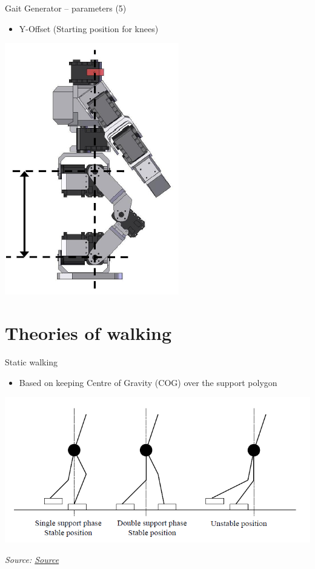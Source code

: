 \documentclass[compress]{beamer}
\newcommand{\source}[2]{{\tiny\it Source: \href{#1}{#2}}}
\begin{document}
\begin{frame}{Gait Generator -- parameters (5)}

    \begin{itemize}

        \item Y-Offset (Starting position for knees)
    \end{itemize}
    \begin{center}
        \includegraphics[height=0.5\paperheight]{bioloid-gait-5}
    \end{center}

\end{frame}

\section{Theories of walking}

\begin{frame}{Static walking}

    \begin{itemize}

        \item Based on keeping Centre of Gravity (COG) over the support polygon
    \end{itemize}

    \begin{center}
        \includegraphics[width=0.8\linewidth]{image45}
        
    \source{http://www.diss.fu-berlin.de/diss/servlets/MCRFileNodeServlet/FUDISS_derivate_000000002504/05_Kapitel5.pdf;jsessionid=BB71E0C0242031B3A6B5F4E873C63233?hosts=}{Source}
    \end{center}
\end{frame}
\end{document}
